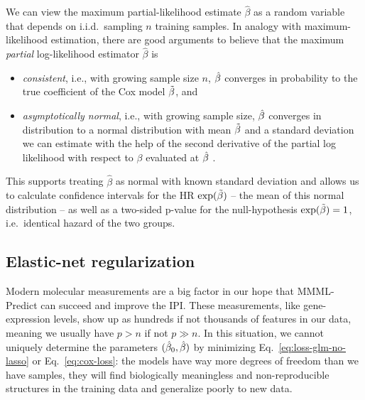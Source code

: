 We can view the maximum partial-likelihood estimate $\hat{\beta}$ as a random variable that depends 
on i.i.d.\ sampling $n$ training samples. In analogy with maximum-likelihood estimation, there are 
good arguments to believe that the maximum \textit{partial} log-likelihood estimator $\hat{\beta}$
is
\begin{itemize}  
    \item \textit{consistent}, i.e., with growing sample size $n$, $\hat{\beta}$ converges in 
        probability to the true coefficient of the Cox model $\tilde{\beta}$, and
    \item \textit{asymptotically normal}, i.e., with growing sample size, $\hat{\beta}$ converges 
        in distribution to a normal distribution with mean $\tilde{\beta}$ and a standard deviation we 
        can estimate with the help of the second derivative of the partial log likelihood with 
        respect to $\beta$ evaluated at $\hat{\beta}$ \cite[8.1--8.4]{klein03}.
\end{itemize}
This supports treating $\hat{\beta}$ as normal with known standard deviation and allows us to
calculate confidence intervals for the HR $\exp(\tilde{\beta})$ -- the mean of this normal distribution -- 
as well as a two-sided p-value for the null-hypothesis $\exp(\tilde{\beta}) = 1$, i.e.\ identical hazard 
of the two groups. 

\subsection{Elastic-net regularization} \label{subsec:elastic-net}

Modern molecular measurements are a big factor in our hope that MMML-Predict can succeed and improve 
the IPI. These measurements, like gene-expression levels, show up as hundreds if not thousands of 
features in our data, meaning we usually have $p > n$ if not $p \gg n$. In this situation, we 
cannot uniquely determine the parameters $(\hat{\beta}_0, \hat{\beta})$ by minimizing 
Eq.\ \eqref{eq:loss-glm-no-lasso} or Eq.\ \eqref{eq:cox-loss}:
the models have way more degrees of freedom than we have samples, they will find biologically 
meaningless and non-reproducible structures in the training data and generalize poorly to new 
data.


